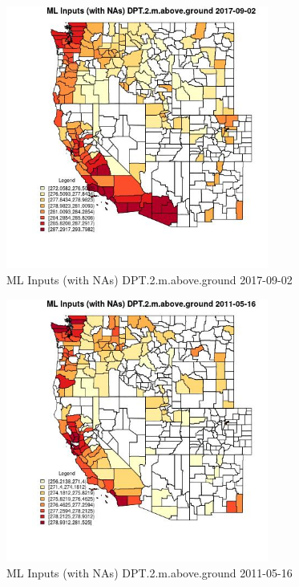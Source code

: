 \begin{figure} 
\centering  
\includegraphics[width=0.77\textwidth]{Code_Outputs/Report_ML_input_PM25_Step4_part_e_de_duplicated_aves_compiled_2019-05-21wNAs_CountyDPT2mabovegroundMean2017-09-02.jpg} 
\caption{\label{fig:Report_ML_input_PM25_Step4_part_e_de_duplicated_aves_compiled_2019-05-21wNAsCountyDPT2mabovegroundMean2017-09-02}ML Inputs (with NAs) DPT.2.m.above.ground 2017-09-02} 
\end{figure} 
 

\begin{figure} 
\centering  
\includegraphics[width=0.77\textwidth]{Code_Outputs/Report_ML_input_PM25_Step4_part_e_de_duplicated_aves_compiled_2019-05-21wNAs_CountyDPT2mabovegroundMean2011-05-16.jpg} 
\caption{\label{fig:Report_ML_input_PM25_Step4_part_e_de_duplicated_aves_compiled_2019-05-21wNAsCountyDPT2mabovegroundMean2011-05-16}ML Inputs (with NAs) DPT.2.m.above.ground 2011-05-16} 
\end{figure} 
 

